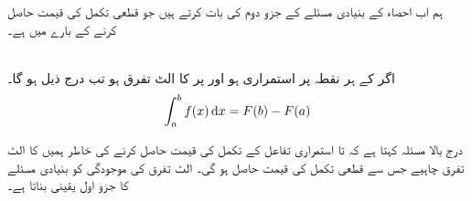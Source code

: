 ہم اب احصاء کے بنیادی مسئلے کے  جزو دوم کی بات کرتے ہیں جو قطعی تکمل کی قیمت حاصل کرنے کے بارے میں ہے۔

\\
اگر  کے ہر نقطہ پر  استمراری ہو اور  پر  کا الٹ تفرق  ہو تب درج ذیل ہو گا۔
\begin{align}\label{مساوات_تکمل_بنیادی_مسئلہ_جزو_دوم_الف}
\int_a^bf(x)\dif x=F(b)-F(a)
\end{align} 

درج بالا مسئلہ کہتا ہے کہ  تا  استمراری تفاعل  کے تکمل کی قیمت حاصل کرنے کی خاطر ہمیں  کا الٹ تفرق  چاہیے  جس سے قطعی تکمل کی قیمت  حاصل ہو گی۔ الٹ تفرق کی موجودگی کو بنیادی مسئلے کا جزو اول یقینی بناتا ہے۔

